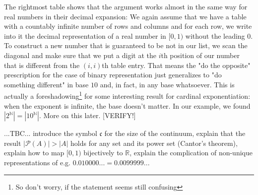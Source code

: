 \medskip
The rightmost table shows that the argument works almost in the same way for real numbers in their decimal expansion: We again assume that we have a table with a countably infinite number of rows and columns and for each row, we write into it the decimal representation of a real number in $[0,1)$ without the leading $0$. To construct a new number that is guaranteed to be not in our list, we scan the diagonal and make sure that we put a digit at the $i$th position of our number that is different from the $(i,i)$th table entry. That means the "do the opposite" prescription for the case of binary representation just generalizes to "do something different" in base $10$ and, in fact, in any base whatsoever. This is actually a foreshadowing\footnote{So don't worry, if the statement seems still confusing} for some interesting result for cardinal exponentiation: when the exponent is infinite, the base doesn't matter. In our example, we found $|2^{\mathbb{N}}| = |10^{\mathbb{N}}|$. More on this later. [VERIFY!]

\medskip
...TBC... introduce the symbol $\mathfrak{c}$ for the size of the continuum, explain that the result $|\mathcal{P}(A)| > |A|$ holds for any set and its power set (Cantor's theorem), explain how to map $[0,1)$ bijectively to $\mathbb{R}$, explain the complication of non-unique representations of e.g. $0.010000... = 0.0099999...$



